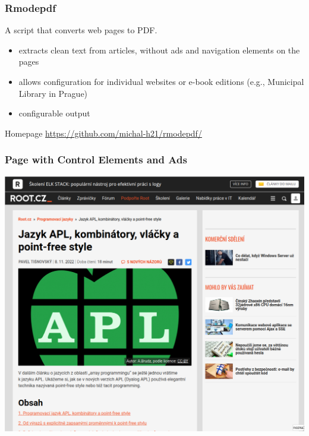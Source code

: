\begin{frame}
  \frametitle{Rmodepdf}

  A script that converts  web pages to PDF.

  \begin{itemize}
    \item extracts clean text from articles, without ads and navigation elements on the pages
    \item allows configuration for individual websites or e-book editions (e.g., Municipal Library in Prague)
    \item configurable output 
  \end{itemize}

  \bigskip

  \begin{block}{Homepage}
  \url{https://github.com/michal-h21/rmodepdf/}
\end{block}
\end{frame}

\begin{frame}
  \frametitle{Page with Control Elements and Ads}
  \begin{center}
    \includegraphics[height=.7\textheight]{img/root-balast.png}
  \end{center}
\end{frame}

